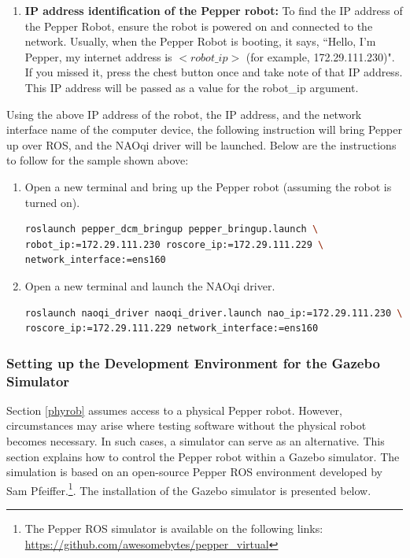 \documentclass{CSSRforAfrica}
\begin{document}
{{\begin{enumerate}
\item \textbf{IP address identification of the Pepper robot:}
To find the IP address of the Pepper Robot, ensure the robot is powered on and connected to the network. Usually, when the Pepper Robot is booting, it says, ``Hello, I'm Pepper, my internet address is $<robot\_ip >$ (for example, 172.29.111.230)". If you missed it, press the chest button once and take note of that IP address. This IP address will be passed as a value for the robot\_ip argument.

\end{enumerate}
\noindent Using the above IP address of the robot, the IP address, and the network interface name of the computer device, the following instruction will bring Pepper up over ROS, and the NAOqi driver will be launched. Below are the instructions to follow for the sample shown above:

\begin{enumerate}
\item Open a new terminal and bring up the Pepper robot (assuming the robot is turned on).
\begin{lstlisting}[style=withoutNumbering, language=bash]
roslaunch pepper_dcm_bringup pepper_bringup.launch \
robot_ip:=172.29.111.230 roscore_ip:=172.29.111.229 \
network_interface:=ens160
\end{lstlisting}

\item Open a new terminal and launch the NAOqi driver.
\begin{lstlisting}[style=withoutNumbering, language=bash]
roslaunch naoqi_driver naoqi_driver.launch nao_ip:=172.29.111.230 \
roscore_ip:=172.29.111.229 network_interface:=ens160
\end{lstlisting} 
\end{enumerate}
}

\subsubsection{Setting up the Development Environment for the Gazebo Simulator}
\label{simulator}
Section \ref{phyrob} assumes access to a physical Pepper robot. However, circumstances may arise where testing software without the physical robot becomes necessary. In such cases, a simulator can serve as an alternative. This section explains how to control the Pepper robot within a Gazebo simulator. The simulation is based on an open-source Pepper ROS environment developed by Sam Pfeiffer.\footnote{The Pepper ROS simulator is available on the following links: \url{https://github.com/awesomebytes/pepper\_virtual}}. The installation of the Gazebo simulator is presented below.

}
\end{document}
